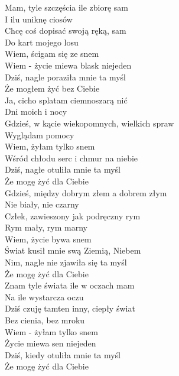 
\begin{flushleft}
Mam, tyle szczęścia ile zbiorę sam \\
I ilu uniknę ciosów \\
Chcę coś dopisać swoją ręką, sam \\
Do kart mojego losu \\
Wiem, ścigam się ze snem \\
Wiem - życie miewa blask niejeden \\
Dziś, nagle poraziła mnie ta myśl \\
Że mogłem żyć bez Ciebie \\
\vskip 3mm
Ja, cicho splatam ciemnoszarą nić \\
Dni moich i nocy \\
Gdzieś, w kącie wiekopomnych, wielkich spraw \\
Wyglądam pomocy \\
Wiem, żyłam tylko snem \\
Wśród chłodu serc i chmur na niebie \\
Dziś, nagłe otuliła mnie ta myśl \\
Że mogę żyć dla Ciebie \\
\vskip 3mm
Gdzieś, między dobrym złem a dobrem złym \\
Nie biały, nie czarny \\
Człek, zawieszony jak podręczny rym \\
Rym mały, rym marny \\
Wiem, życie bywa snem \\
Świat kusił mnie swą Ziemią, Niebem \\
Nim, nagle nie zjawiła się ta myśl \\
Że mogę żyć dla Ciebie \\
\vskip 3mm
Znam tyle świata ile w oczach mam \\
Na ile wystarcza oczu \\
Dziś czuję tamten inny, ciepły świat \\
Bez cienia, bez mroku \\
Wiem - żyłam tylko snem \\
Życie miewa sen niejeden \\
Dziś, kiedy otuliła mnie ta myśl \\
Że mogę żyć dla Ciebie  \\
\end{flushleft}
\clearpage
